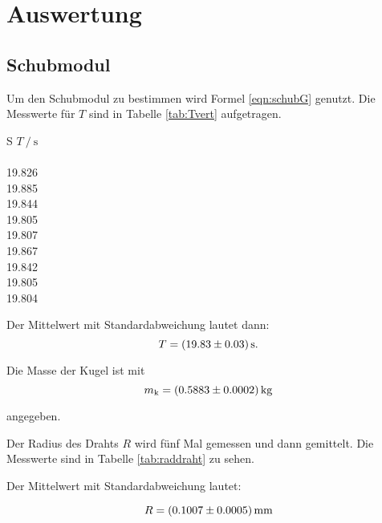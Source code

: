 \section{Auswertung}
\label{sec:Auswertung}

\subsection{Schubmodul}

Um den Schubmodul zu bestimmen wird Formel \eqref{eqn:schubG} genutzt.                  %
Die Messwerte für $T$ sind in Tabelle \ref{tab:Tvert} aufgetragen.

\begin{table}[h]
  \centering
  \caption{Messwerte der Periodendauern bei vertikalem Magnet in der Kugel.}
  \label{tab:Tvert}
  \begin{tabular}{S}
    \toprule
    {$T\:/\:\si{\second}$} \\
     \\
    19.826 \\
    19.885 \\
    19.844 \\
    19.805 \\
    19.807 \\
    19.867 \\
    19.842 \\
    19.805 \\
    19.804 \\
    \bottomrule
  \end{tabular}
\end{table}

Der Mittelwert mit Standardabweichung lautet dann:
\begin{equation*}
  T = \SI{19.83 +- 0.03}{\second}.
\end{equation*}

Die Masse der Kugel ist mit
\begin{equation*}
  m_{\text{k}}= \SI{0.5883 +- 0.0002}{\kilogram}
\end{equation*}

angegeben.

Der Radius des Drahts $R$ wird fünf Mal gemessen und dann gemittelt.
Die Messwerte sind in Tabelle \ref{tab:raddraht} zu sehen.

Der Mittelwert mit Standardabweichung lautet:

\begin{equation*}
  R = \SI{0.1007 +- 0.0005}{\milli\meter}
\end{equation*}

